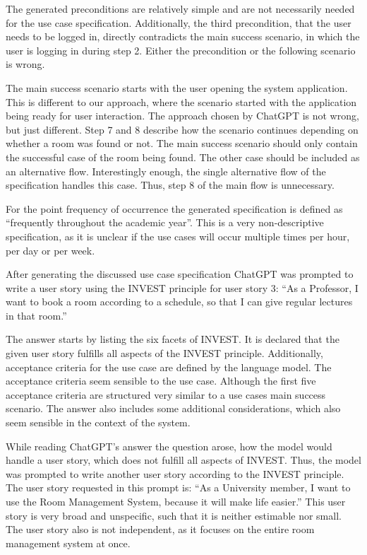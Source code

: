 \documentclass[conference,onecolumn]{IEEEtran}
\begin{document}
The generated preconditions are relatively simple and are not necessarily needed for the use case specification. Additionally, the third precondition, that the user needs to be logged in, directly contradicts the main success scenario, in which the user is logging in during step 2. Either the precondition or the following scenario is wrong.

The main success scenario starts with the user opening the system application. This is different to our approach, where the scenario started with the application being ready for user interaction. The approach chosen by ChatGPT is not wrong, but just different.
Step 7 and 8 describe how the scenario continues depending on whether a room was found or not. The main success scenario should only contain the successful case of the room being found. The other case should be included as an alternative flow.
Interestingly enough, the single alternative flow of the specification handles this case. Thus, step 8 of the main flow is unnecessary.

For the point frequency of occurrence the generated specification is defined as ``frequently throughout the academic year''. This is a very non-descriptive specification, as it is unclear if the use cases will occur multiple times per hour, per day or per week.


After generating the discussed use case specification ChatGPT was prompted to write a user story using the INVEST principle for user story 3: ``As a Professor, I want to book a room according to a schedule, so that I can give regular lectures in that room.''

The answer starts by listing the six facets of INVEST. It is declared that the given user story fulfills all aspects of the INVEST principle.
Additionally, acceptance criteria for the use case are defined by the language model. The acceptance criteria seem sensible to the use case. Although the first five acceptance criteria are structured very similar to a use cases main success scenario.
The answer also includes some additional considerations, which also seem sensible in the context of the system.

While reading ChatGPT's answer the question arose, how the model would handle a user story, which does not fulfill all aspects of INVEST.
Thus, the model was prompted to write another user story according to the INVEST principle. The user story requested in this prompt is: ``As a University member, I want to use the Room Management System, because it will make life easier.''
This user story is very broad and unspecific, such that it is neither estimable nor small. The user story also is not independent, as it focuses on the entire room management system at once.
\end{document}
